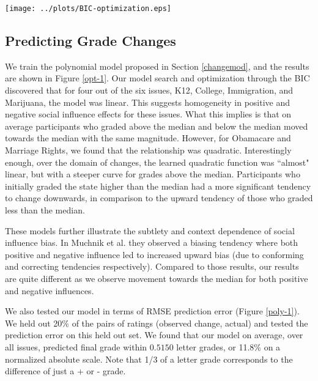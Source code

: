 \begin{figure*}[ht!]
\hspace{-7em}
    \texttt{[image: ../plots/BIC-optimization.eps]}
      \caption{For the participants that changed their grades, we plot the difference between their grade and the median (X-axis), and their changed grade (Y-axis). We overlay the optimal polynomial model to represent the relationship $f(x) = y$. Below each plot, is the BIC objective function showing how we picked an optimal degree of polynomial.}
      \label{opt-1}
\end{figure*}
\subsection{Predicting Grade Changes}
We train the polynomial model proposed in Section \ref{changemod}, and the results are shown in Figure \ref{opt-1}.
Our model search and optimization through the BIC discovered that for four out of the six issues, K12, College, Immigration, and Marijuana, the model was linear.
This suggests homogeneity in positive and negative social influence effects for these issues.
What this implies is that on average participants who graded above the median and below the median moved towards the median with the same magnitude.
However, for Obamacare and Marriage Rights, we found that the relationship was quadratic.
Interestingly enough, over the domain of changes, the learned quadratic function was ``almost" linear, but with a steeper curve for grades above the median.
Participants who initially graded the state higher than the median had a more significant tendency to change downwards, in comparison to the upward tendency of those who graded less than the median.

These models further illustrate the subtlety and context dependence of social influence bias. 
In Muchnik et al. they observed a biasing tendency where both positive and negative influence led to increased upward bias (due to conforming and correcting tendencies respectively).
Compared to those results, our results are quite different as we observe movement towards the median for both positive and negative influences.

We also tested our model in terms of RMSE prediction error (Figure \ref{poly-1}). 
We held out 20\% of the pairs of ratings (observed change, actual) and tested the prediction error on this held out set.
We found that our model on average, over all issues, predicted final grade within $0.5150$ letter grades, or 11.8\% on a normalized absolute scale.
Note that 1/3 of a letter grade corresponds to the difference of just a + or - grade.

